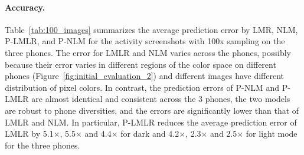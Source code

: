 \paragraph{Accuracy.}
Table~\ref{tab:100_images}
summarizes the average prediction error by LMR, NLM, P-LMLR, and P-NLM
for the activity screenshots with 100x sampling on the three phones.
The error for LMLR and NLM varies across the phones,
possibly because their error varies in different regions of the color space
on different phones (Figure~\ref{fig:initial_evaluation_2})
and different images have different distribution of pixel colors.
In contrast, the prediction errors of P-NLM and P-LMLR are
almost identical and consistent across the 3 phones,
\ie the two models are robust to phone diversities,
and the errors are significantly lower than that of LMLR and NLM.
In particular, P-LMLR reduces the average prediction error
of LMLR by
    5.1$\times$, 5.5$\times$ and 4.4$\times$ for dark
    and 4.2$\times$, 2.3$\times$ and 2.5$\times$ for light mode for the three phones.


